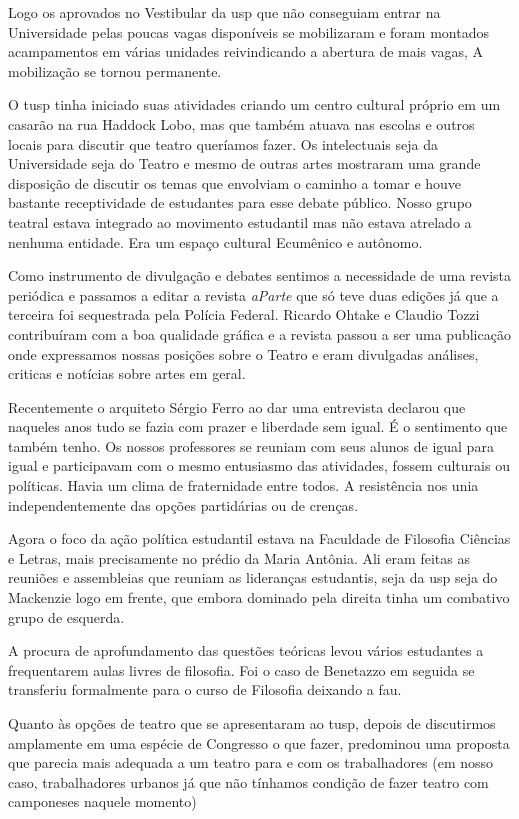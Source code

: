 Logo os aprovados no Vestibular da {\sc usp} que não conseguiam entrar na
Universidade pelas poucas vagas disponíveis se mobilizaram e foram
montados acampamentos em várias unidades reivindicando a abertura de
mais vagas, A mobilização se tornou permanente.

O {\sc tusp} tinha iniciado suas atividades criando um centro cultural próprio
em um casarão na rua Haddock Lobo, mas que também atuava nas escolas e
outros locais para discutir que teatro queríamos fazer. Os intelectuais
seja da Universidade seja do Teatro e mesmo de outras artes mostraram
uma grande disposição de discutir os temas que envolviam o caminho a
tomar e houve bastante receptividade de estudantes para esse debate
público. Nosso grupo teatral estava integrado ao movimento estudantil
mas não estava atrelado a nenhuma entidade. Era um espaço cultural
Ecumênico e autônomo.

Como instrumento de divulgação e debates sentimos a necessidade de uma
revista periódica e passamos a editar a revista {\it aParte} que só teve
duas edições já que a terceira foi sequestrada pela Polícia Federal.
Ricardo Ohtake e Claudio Tozzi contribuíram com a boa qualidade gráfica
e a revista passou a ser uma publicação onde expressamos nossas posições
sobre o Teatro e eram divulgadas análises, criticas e notícias sobre
artes em geral.

Recentemente o arquiteto Sérgio Ferro ao dar uma entrevista declarou que
naqueles anos tudo se fazia com prazer e liberdade sem igual. É o
sentimento que também tenho. Os nossos professores se reuniam com seus
alunos de igual para igual e participavam com o mesmo entusiasmo das
atividades, fossem culturais ou políticas. Havia um clima de
fraternidade entre todos. A resistência nos unia independentemente das
opções partidárias ou de crenças.

Agora o foco da ação política estudantil estava na Faculdade de
Filosofia Ciências e Letras, mais precisamente no prédio da Maria
Antônia. Ali eram feitas as reuniões e assembleias que reuniam as
lideranças estudantis, seja da {\sc usp} seja do Mackenzie logo em frente, que
embora dominado pela direita tinha um combativo grupo de esquerda.

A procura de aprofundamento das questões teóricas levou vários
estudantes a frequentarem aulas livres de filosofia. Foi o caso de
Benetazzo em seguida se transferiu formalmente para o curso de Filosofia
deixando a {\sc fau}.

Quanto às opções de teatro que se apresentaram ao {\sc tusp}, depois de
discutirmos amplamente em uma espécie de Congresso o que fazer,
predominou uma proposta que parecia mais adequada a um teatro para e com
os trabalhadores (em nosso caso, trabalhadores urbanos já que não
tínhamos condição de fazer teatro com camponeses naquele momento)

